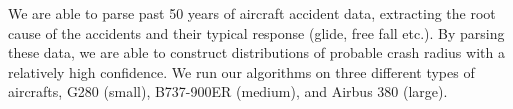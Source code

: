 \documentclass[12pt, letterpaper]{article}  %
\theoremstyle{definition}
\theoremstyle{remark}
\theoremstyle{plain}
\begin{document}



We are able to parse past 50 years of aircraft accident
data, extracting the root cause of the accidents and their typical response (glide, free fall etc.). By parsing these data, we are able to construct distributions of probable crash radius with a relatively high confidence.  We run our algorithms on three different types of aircrafts, G280 (small), B737-900ER (medium), and Airbus 380 (large).



\end{document}
